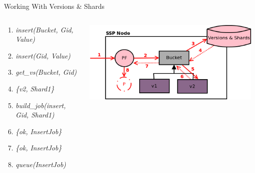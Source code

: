 \documentclass[aspectratio=169]{beamer}
\begin{document}
\begin{frame}{Working With Versions \& Shards}
    \begin{columns}
        \begin{column}[c]{0.5\textwidth}
            \begin{enumerate}
                \item \emph{insert(Bucket, Gid, Value)}
                \item \emph{insert(Gid, Value)}
                \item \emph{get\_vs(Bucket, Gid)}
                \item \emph{\{v2, Shard1\}}
                \item \emph{build\_job(insert, Gid, Shard1)}
                \item \emph{\{ok, InsertJob\}}
                \item \emph{\{ok, InsertJob\}}
                \item \emph{queue(InsertJob)}
            \end{enumerate}
        \end{column}
        \begin{column}[c]{0.5\textwidth}
            \includegraphics[width=\textwidth]{images/versionsandshards.png}
        \end{column}
    \end{columns}
\end{frame}
\end{document}
